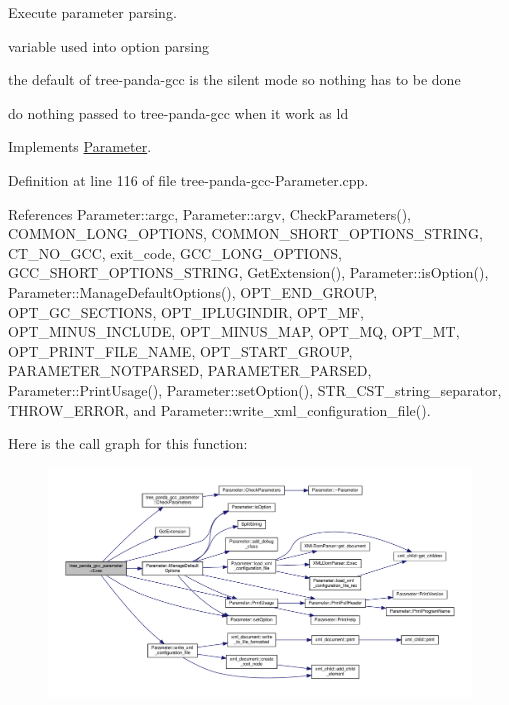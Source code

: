 Execute parameter parsing. 

variable used into option parsing

the default of tree-\/panda-\/gcc is the silent mode so nothing has to be done

do nothing passed to tree-\/panda-\/gcc when it work as ld 

Implements \hyperlink{classParameter_a9f5cc51b6e9ac1e01fe1c5a6362c030b}{Parameter}.



Definition at line 116 of file tree-\/panda-\/gcc-\/\+Parameter.\+cpp.



References Parameter\+::argc, Parameter\+::argv, Check\+Parameters(), C\+O\+M\+M\+O\+N\+\_\+\+L\+O\+N\+G\+\_\+\+O\+P\+T\+I\+O\+NS, C\+O\+M\+M\+O\+N\+\_\+\+S\+H\+O\+R\+T\+\_\+\+O\+P\+T\+I\+O\+N\+S\+\_\+\+S\+T\+R\+I\+NG, C\+T\+\_\+\+N\+O\+\_\+\+G\+CC, exit\+\_\+code, G\+C\+C\+\_\+\+L\+O\+N\+G\+\_\+\+O\+P\+T\+I\+O\+NS, G\+C\+C\+\_\+\+S\+H\+O\+R\+T\+\_\+\+O\+P\+T\+I\+O\+N\+S\+\_\+\+S\+T\+R\+I\+NG, Get\+Extension(), Parameter\+::is\+Option(), Parameter\+::\+Manage\+Default\+Options(), O\+P\+T\+\_\+\+E\+N\+D\+\_\+\+G\+R\+O\+UP, O\+P\+T\+\_\+\+G\+C\+\_\+\+S\+E\+C\+T\+I\+O\+NS, O\+P\+T\+\_\+\+I\+P\+L\+U\+G\+I\+N\+D\+IR, O\+P\+T\+\_\+\+MF, O\+P\+T\+\_\+\+M\+I\+N\+U\+S\+\_\+\+I\+N\+C\+L\+U\+DE, O\+P\+T\+\_\+\+M\+I\+N\+U\+S\+\_\+\+M\+AP, O\+P\+T\+\_\+\+MQ, O\+P\+T\+\_\+\+MT, O\+P\+T\+\_\+\+P\+R\+I\+N\+T\+\_\+\+F\+I\+L\+E\+\_\+\+N\+A\+ME, O\+P\+T\+\_\+\+S\+T\+A\+R\+T\+\_\+\+G\+R\+O\+UP, P\+A\+R\+A\+M\+E\+T\+E\+R\+\_\+\+N\+O\+T\+P\+A\+R\+S\+ED, P\+A\+R\+A\+M\+E\+T\+E\+R\+\_\+\+P\+A\+R\+S\+ED, Parameter\+::\+Print\+Usage(), Parameter\+::set\+Option(), S\+T\+R\+\_\+\+C\+S\+T\+\_\+string\+\_\+separator, T\+H\+R\+O\+W\+\_\+\+E\+R\+R\+OR, and Parameter\+::write\+\_\+xml\+\_\+configuration\+\_\+file().

Here is the call graph for this function\+:
\nopagebreak
\begin{figure}[H]
\begin{center}
\leavevmode
\includegraphics[width=350pt]{da/df6/classtree__panda__gcc__parameter_a059ff6cba08daf6710ffa46b2c97e2ee_cgraph}
\end{center}
\end{figure}
\mbox{\label{classtree__panda__gcc__parameter_a7e40c5706de9fa5cd9fbb231876feb75}} 
